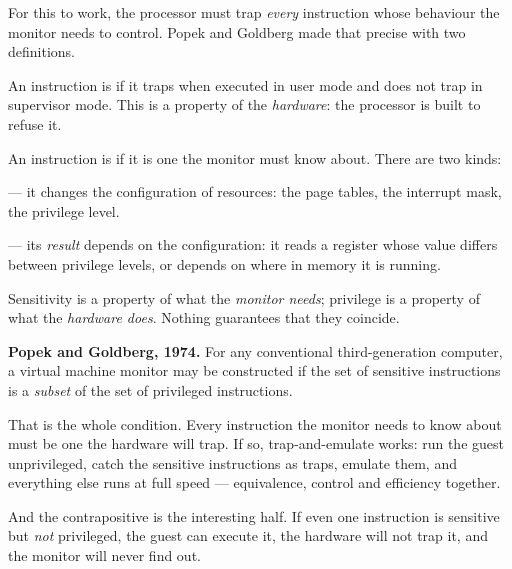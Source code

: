 For this to work, the processor must trap \emph{every} instruction whose
behaviour the monitor needs to control. Popek and Goldberg made that precise
with two definitions.

\begin{definitionbox}
An instruction is  if it traps when executed in user mode and
does not trap in supervisor mode. This is a property of the \emph{hardware}:
the processor is built to refuse it.

\smallskip
An instruction is  if it is one the monitor must know about.
There are two kinds:
\begin{tight}
  \item {} --- it changes the configuration of resources:
        the page tables, the interrupt mask, the privilege level.
  \item {} --- its \emph{result} depends on the
        configuration: it reads a register whose value differs between
        privilege levels, or depends on where in memory it is running.
\end{tight}

\smallskip
Sensitivity is a property of what the \emph{monitor needs}; privilege is a
property of what the \emph{hardware does}. Nothing guarantees that they
coincide.
\end{definitionbox}

\begin{conceptbox}
\textbf{Popek and Goldberg, 1974.} For any conventional third-generation
computer, a virtual machine monitor may be constructed if the set of sensitive
instructions is a \emph{subset} of the set of privileged instructions.

\smallskip
That is the whole condition. Every instruction the monitor needs to know about
must be one the hardware will trap. If so, trap-and-emulate works: run the guest
unprivileged, catch the sensitive instructions as traps, emulate them, and
everything else runs at full speed --- equivalence, control and efficiency
together.

\smallskip
And the contrapositive is the interesting half. If even one instruction is
sensitive but \emph{not} privileged, the guest can execute it, the hardware will
not trap it, and the monitor will never find out.
\end{conceptbox}

